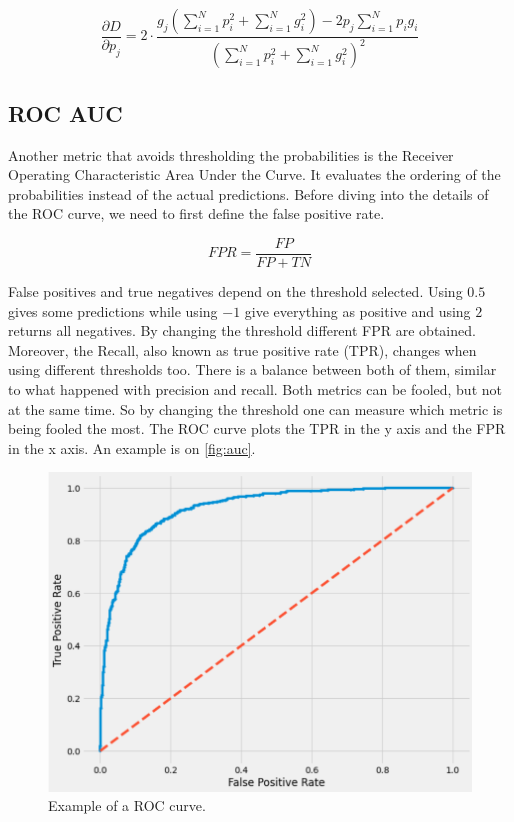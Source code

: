 \begin{equation}
    \frac{\partial D}{\partial p_j} = 2\cdot \frac{g_j\left(\sum_{i=1}^N p_i^2 + \sum_{i=1}^N g_i^2\right) - 2p_j \sum_{i=1}^N p_ig_i}{\left(\sum_{i=1}^N p_i^2 + \sum_{i=1}^N g_i^2 \right)^2}
\end{equation}

\subsection{ROC AUC}

Another metric that avoids thresholding the probabilities is the Receiver Operating Characteristic Area Under the Curve. It evaluates the ordering of the probabilities instead of the actual predictions. Before diving into the details of the ROC curve, we need to first define the false positive rate.

\begin{equation}
    FPR = \frac{FP}{FP + TN}
\end{equation}

False positives and true negatives depend on the threshold selected. Using $0.5$ gives some predictions while using $-1$ give everything as positive and using $2$ returns all negatives. By changing the threshold different FPR are obtained. Moreover, the Recall, also known as true positive rate (TPR), changes when using different thresholds too. There is a balance between both of them, similar to what happened with precision and recall. Both metrics can be fooled, but not at the same time. So by changing the threshold one can measure which metric is being fooled the most. The ROC curve plots the TPR in the y axis and the FPR in the x axis. An example is on \autoref{fig:auc}.

\begin{figure}[ht]
    \centering
    \includegraphics[width=\textwidth]{imgs/auc.png}
    \caption{Example of a ROC curve.}
    \label{fig:auc}
\end{figure}

